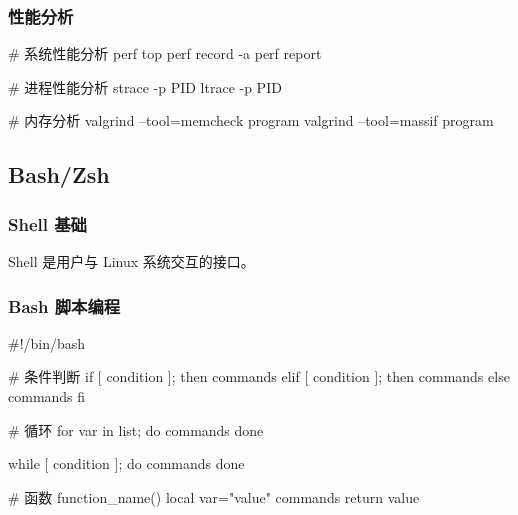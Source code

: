 \subsubsection{性能分析}


\begin{lstcode}[numbers=none]
  # 系统性能分析
  perf top
  perf record -a
  perf report

  # 进程性能分析
  strace -p PID
  ltrace -p PID

  # 内存分析
  valgrind --tool=memcheck program
  valgrind --tool=massif program
\end{lstcode}

\subsection{Bash/Zsh}

\subsubsection{Shell 基础}

Shell 是用户与 Linux 系统交互的接口。



\subsubsection{Bash 脚本编程}


\begin{lstcode}[numbers=none]
#!/bin/bash

# 条件判断
if [ condition ]; then
    commands
elif [ condition ]; then
    commands
else
    commands
fi

# 循环
for var in list; do
    commands
done

while [ condition ]; do
    commands
done

# 函数
function_name() {
    local var="value"
    commands
    return value
}
\end{lstcode}

